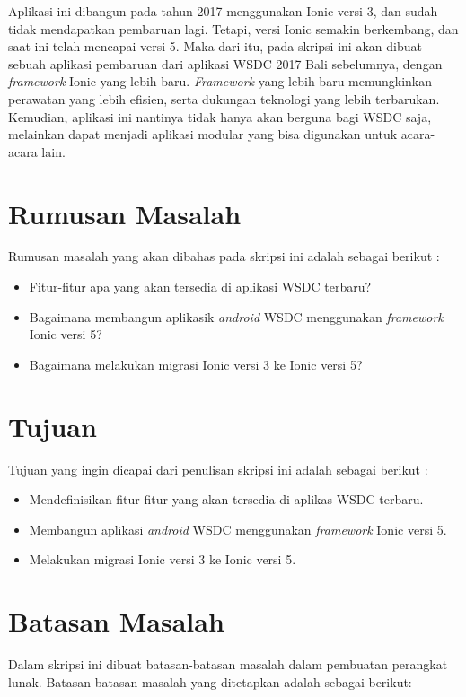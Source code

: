 Aplikasi ini dibangun pada tahun 2017 menggunakan Ionic versi 3, dan sudah tidak mendapatkan pembaruan lagi. Tetapi, versi Ionic semakin berkembang, dan saat ini telah mencapai versi 5. Maka dari itu, pada skripsi ini akan dibuat sebuah aplikasi pembaruan dari aplikasi WSDC 2017 Bali sebelumnya, dengan \textit{framework} Ionic yang lebih baru. \textit{Framework} yang lebih baru memungkinkan perawatan yang lebih efisien, serta dukungan teknologi yang lebih terbarukan. Kemudian, aplikasi ini nantinya tidak hanya akan berguna bagi WSDC saja, melainkan dapat menjadi aplikasi modular yang bisa digunakan untuk acara-acara lain.


\newpage
\section{Rumusan Masalah}
\label{sec:rumusan}
Rumusan masalah yang akan dibahas pada skripsi ini adalah sebagai berikut :
\begin{itemize}
	\item Fitur-fitur apa yang akan tersedia di aplikasi WSDC terbaru?
	\item Bagaimana membangun aplikasik {\it android} WSDC menggunakan {\it framework} Ionic versi 5?
	\item Bagaimana melakukan migrasi Ionic versi 3 ke Ionic versi 5?
\end{itemize}


\section{Tujuan}
\label{sec:tujuan}
Tujuan yang ingin dicapai dari penulisan skripsi ini adalah sebagai berikut :
\begin{itemize}
	\item Mendefinisikan fitur-fitur yang akan tersedia di aplikas WSDC terbaru.
	\item Membangun aplikasi {\it android} WSDC menggunakan {\it framework} Ionic versi 5.
	\item Melakukan migrasi Ionic versi 3 ke Ionic versi 5.
\end{itemize}


\section{Batasan Masalah}
\label{sec:batasan}
Dalam skripsi ini dibuat batasan-batasan masalah dalam pembuatan perangkat lunak.  Batasan-batasan masalah yang ditetapkan adalah sebagai berikut:

